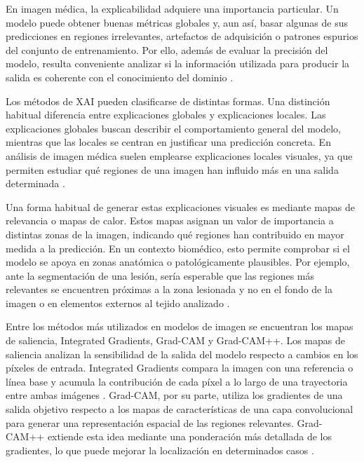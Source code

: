 En imagen médica, la explicabilidad adquiere una importancia particular. Un modelo puede obtener buenas métricas globales y, aun así, basar algunas de sus predicciones en regiones irrelevantes, artefactos de adquisición o patrones espurios del conjunto de entrenamiento. Por ello, además de evaluar la precisión del modelo, resulta conveniente analizar si la información utilizada para producir la salida es coherente con el conocimiento del dominio \citep{samek2017explainableartificialintelligenceunderstanding,litjens2017survey}.

Los métodos de XAI pueden clasificarse de distintas formas. Una distinción habitual diferencia entre explicaciones globales y explicaciones locales. Las explicaciones globales buscan describir el comportamiento general del modelo, mientras que las locales se centran en justificar una predicción concreta. En análisis de imagen médica suelen emplearse explicaciones locales visuales, ya que permiten estudiar qué regiones de una imagen han influido más en una salida determinada \citep{arrieta2020xai}.

Una forma habitual de generar estas explicaciones visuales es mediante mapas de relevancia o mapas de calor. Estos mapas asignan un valor de importancia a distintas zonas de la imagen, indicando qué regiones han contribuido en mayor medida a la predicción. En un contexto biomédico, esto permite comprobar si el modelo se apoya en zonas anatómica o patológicamente plausibles. Por ejemplo, ante la segmentación de una lesión, sería esperable que las regiones más relevantes se encuentren próximas a la zona lesionada y no en el fondo de la imagen o en elementos externos al tejido analizado \citep{samek2017explainableartificialintelligenceunderstanding,Selvaraju_2019}.

Entre los métodos más utilizados en modelos de imagen se encuentran los mapas de saliencia, Integrated Gradients, Grad-CAM y Grad-CAM++. Los mapas de saliencia analizan la sensibilidad de la salida del modelo respecto a cambios en los píxeles de entrada. Integrated Gradients compara la imagen con una referencia o línea base y acumula la contribución de cada píxel a lo largo de una trayectoria entre ambas imágenes \citep{sundararajan2017axiomaticattributiondeepnetworks}. Grad-CAM, por su parte, utiliza los gradientes de una salida objetivo respecto a los mapas de características de una capa convolucional para generar una representación espacial de las regiones relevantes. Grad-CAM++ extiende esta idea mediante una ponderación más detallada de los gradientes, lo que puede mejorar la localización en determinados casos \citep{Selvaraju_2019,Chattopadhay_2018}.

